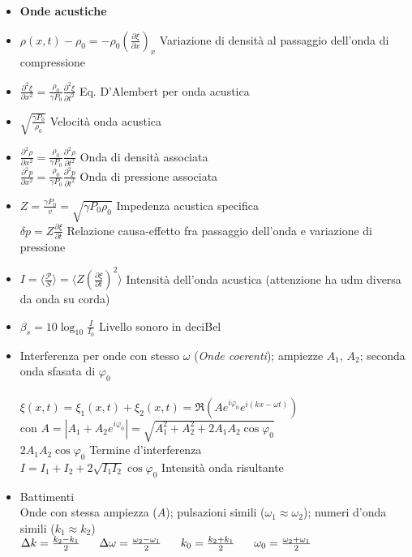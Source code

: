 \documentclass[a4paper]{article}
\begin{document}
\begin{itemize}
 	\item \textbf{Onde acustiche} 
 	\item $\rho(x,t)-\rho_0 =-\rho_0(\frac{\partial \xi}{\partial x})_x $ Variazione di densità al passaggio dell'onda di compressione
 	\item $\frac{\partial^2 \xi}{\partial x^2}=\frac{\rho_0}{\gamma P_0} \frac{\partial^2 \xi}{\partial t^2}$ Eq. D'Alembert per onda acustica
 	\item $\sqrt{\frac{\gamma P_0}{\rho_0}}$ Velocità onda acustica
 	\item $\frac{\partial^2 \rho}{\partial x^2}=\frac{\rho_0}{\gamma P_0} \frac{\partial^2 \rho}{\partial t^2}$ Onda di densità associata\\
 	$\frac{\partial^2 p}{\partial x^2}=\frac{\rho_0}{\gamma P_0} \frac{\partial^2 p}{\partial t^2}$ Onda di pressione associata
 	\item $Z=\frac{\gamma P_0}{v}=\sqrt{\gamma P_0 \rho_0}$ Impedenza acustica specifica\\
 	$\delta p=Z \frac{\partial \xi}{\partial t}$ Relazione causa-effetto fra passaggio dell'onda e variazione di pressione
 	\item $I=\langle\frac{\mathcal{P}}{S}\rangle=\langle Z(\frac{\partial \xi}{\partial t})^2\rangle$ Intensità dell'onda acustica (attenzione ha udm diversa da onda su corda)
 	\item $\beta_s =10\log_{10}\frac{I}{I_0}$ Livello sonoro in deciBel
 	\item Interferenza per onde con stesso $\omega$ (\textit{Onde coerenti}); ampiezze $A_1$, $A_2$; seconda onda sfasata di $\varphi_0$\\ \\
 	$\xi(x,t)=\xi_1(x,t)+\xi_2(x,t)=\Re(Ae^{i\varphi_0}e^{i(kx-\omega t)})$\\
 	con $A=|A_1+A_2 e^{i\varphi_0}|=\sqrt{A_1^2+A_2^2+2A_1A_2\cos\varphi_0}$\\
 	$2A_1A_2\cos\varphi_0$ \hspace{0.4cm} Termine d'interferenza\\
 	$I=I_1+I_2+2\sqrt{I_1I_2}\cos\varphi_0$ \hspace{0.4cm} Intensità onda risultante
 	\item Battimenti\\
 	Onde con stessa ampiezza ($A$); pulsazioni simili ($\omega_1 \approx \omega_2$); numeri d'onda simili ($k_1 \approx k_2$)\\
 	$\Delta k = \frac{k_2-k_1}{2} \hspace{0.6cm} \Delta \omega = \frac{\omega_2 - \omega_1}{2} \hspace{0.6cm} k_0 = \frac{k_2+k_1}{2} \hspace{0.6cm} \omega_0 = \frac{\omega_2 + \omega_1}{2}$\\

\end{itemize}
\end{document}
